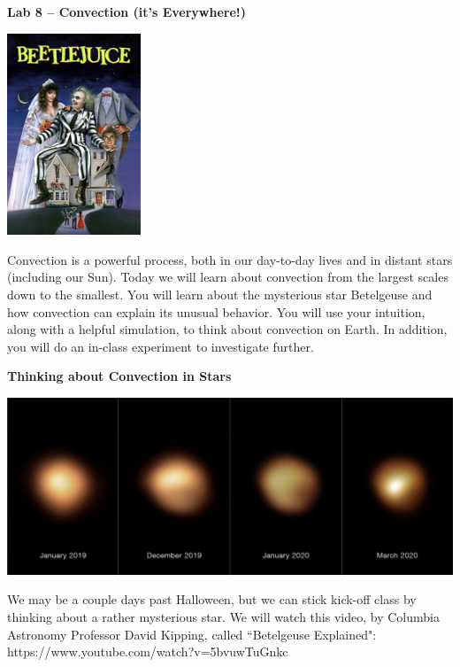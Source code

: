\documentclass[letterpaper,11pt]{article}
\begin{document}
\begin{center}
\textbf{\LARGE{Lab 8 -- Convection (it's Everywhere!)}}

\end{center}
\vspace{.2in}

\begin{center}
\includegraphics[width=4cm]{movie.png}
\vspace{.1in}
\end{center}

Convection is a powerful process, both in our day-to-day lives and in distant stars (including our Sun). Today we will learn about convection from the largest scales down to the smallest. You will learn about the mysterious star Betelgeuse and how convection can explain its unusual behavior. You will use your intuition, along with a helpful simulation, to think about convection on Earth. In addition, you will do an in-class experiment to investigate further. 
\vspace{.2in}

\textbf{\Large{Thinking about Convection in Stars}}
\vspace{.2in}

\includegraphics[width=\textwidth]{dimming.png}
\vspace{.1in}

We may be a couple days past Halloween, but we can stick kick-off class by thinking about a rather mysterious star. We will watch this video, by Columbia Astronomy Professor David Kipping, called ``Betelgeuse Explained": https://www.youtube.com/watch?v=5bvuwTuGnkc \\
\end{document}
